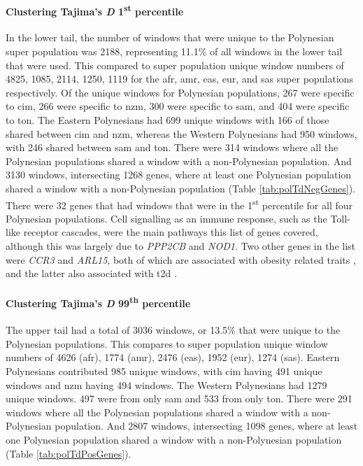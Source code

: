 \documentclass[]{report}
\let\oldparagraph\paragraph
\renewcommand{\paragraph}[1]{\oldparagraph{#1}\mbox{}}
\begin{document}
\paragraph{\texorpdfstring{Clustering Tajima's \emph{D}
1\textsuperscript{st}
percentile}{Clustering Tajima's D 1st percentile}}\label{clustering-tajimas-d-1st-percentile}

In the lower tail, the number of windows that were unique to the
Polynesian super population was 2188, representing 11.1\% of all windows
in the lower tail that were used. This compared to super population
unique window numbers of 4825, 1085, 2114, 1250, 1119 for the \gls{afr},
\gls{amr}, \gls{eas}, \gls{eur}, and \gls{sas} super populations
respectively. Of the unique windows for Polynesian populations, 267 were
specific to \gls{cim}, 266 were specific to \gls{nzm}, 300 were specific
to \gls{sam}, and 404 were specific to \gls{ton}. The Eastern
Polynesians had 699 unique windows with 166 of those shared between
\gls{cim} and \gls{nzm}, whereas the Western Polynesians had 950
windows, with 246 shared between \gls{sam} and \gls{ton}. There were 314
windows where all the Polynesian populations shared a window with a
non-Polynesian population. And 3130 windows, intersecting 1268 genes,
where at least one Polynesian population shared a window with a
non-Polynesian population (Table \ref{tab:polTdNegGenes}). There were 32
genes that had windows that were in the 1\textsuperscript{st} percentile
for all four Polynesian populations. Cell signalling as an immune
response, such as the Toll-like receptor cascades, were the main
pathways this list of genes covered, although this was largely due to
\emph{PPP2CB} and \emph{NOD1}. Two other genes in the list were
\emph{CCR3} and \emph{ARL15}, both of which are associated with obesity
related traits \citep{comuzzie2012novel, shungin2015genetic}, and the
latter also associated with \gls{t2d} \citep{mahajan2014genome}.

\paragraph{\texorpdfstring{Clustering Tajima's \emph{D}
99\textsuperscript{th}
percentile}{Clustering Tajima's D 99th percentile}}\label{clustering-tajimas-d-99th-percentile}

The upper tail had a total of 3036 windows, or 13.5\% that were unique
to the Polynesian populations. This compares to super population unique
window numbers of 4626 (\gls{afr}), 1774 (\gls{amr}), 2476 (\gls{eas}),
1952 (\gls{eur}), 1274 (\gls{sas}). Eastern Polynesians contributed 985
unique windows, with \gls{cim} having 491 unique windows and \gls{nzm}
having 494 windows. The Western Polynesians had 1279 unique windows. 497
were from only \gls{sam} and 533 from only \gls{ton}. There were 291
windows where all the Polynesian populations shared a window with a
non-Polynesian population. And 2807 windows, intersecting 1098 genes,
where at least one Polynesian population shared a window with a
non-Polynesian population (Table \ref{tab:polTdPosGenes}).
\end{document}
